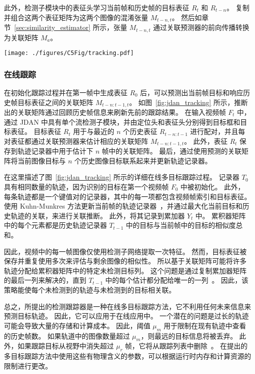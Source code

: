 此外，检测子模块中的表征头学习当前帧和历史帧的目标表征 $R_t$ 和 $R_{t-n}$。
复制并组合这两个表征矩阵为这两个图像的混淆张量 $M_{t-n,t}$。
然后如章节~\ref{sec:similarity_estimator} 所示，张量 $M_{t-n, t}$ 通过关联预测器的前向传播转换为关联矩阵 $M_a$。

\begin{figure*}[ht]
	\centering
	\texttt{[image: ./figures/C5Fig/tracking.pdf]}
	\vspace{0.2em}
	\caption{JDAN 执行在线多目标跟踪的过程}
	\label{fig:jdan_tracking}
\end{figure*}

\subsubsection{在线跟踪}
在初始化跟踪过程并在第一帧中生成表征 $R_0$ 后，可以预测出当前帧目标和响应历史帧目标表征之间的关联矩阵 $M_{t-n:t-1,t}$。
如图~\ref{fig:jdan_tracking} 所示，推断出的关联矩阵通过回顾历史帧信息来刷新先前的跟踪结果。
在输入视频帧 $F_t$ 中，通过 JDAN 中具有单个流检测子模块，并由定位头和表征头分别得到目标框和目标表征。
目标表征 $R_t$ 用于与最近的 $n$ 个历史表征 $R_{t-n:t-1}$ 进行配对，并且每对表征都通过关联预测器来估计相应的关联矩阵 $M_{t-n:t-1,t}$。
此外，表征 $R_t$ 保存到轨迹记录器中用于估计下 $n$ 帧中的关联矩阵。
最后，通过使用预测的关联矩阵将当前图像目标与 $n$ 个历史图像目标联系起来并更新轨迹记录器。

在这里描述了图~\ref{fig:jdan_tracking} 所示的详细在线多目标跟踪过程。
记录器 $T_0$ 具有相同数量的轨迹，因为识别的目标在第一个视频帧 $F_0$ 中被初始化。
此外，每条轨迹都是一个键值对的记录器，其中的每一项都包含视频帧索引和目标表征。
使用 Kuhn-Munkres 方法更新当前帧的轨迹记录器~\cite{Munkres1957}，并通过最大化当前目标和历史轨迹的关联，来进行关联推断。
此外，将其记录到累加器 $Y_{t}$ 中。
累积器矩阵中的每个元素都是历史轨迹记录器 $T_{t-1}$ 中的目标与当前帧中的目标的相似度总和。

因此，视频中的每一帧图像仅使用检测子网络提取一次特征。
然而，目标表征被保存并重复使用多次来评估与剩余图像的相似性。
所以基于关联矩阵可能将许多轨迹分配给累积器矩阵中的特定未检测目标列。
这个问题是通过复制累加器矩阵的最后一列来解决的，直到 $T_{t-1}$ 中的每个估计都分配给唯一的一列~\cite{dan}。
因此，该策略能使每个未检测到的轨迹与未检测到的目标相关联。

总之，所提出的检测跟踪器是一种在线多目标跟踪方法，它不利用任何未来信息来预测目标轨迹。
因此，它可以应用于在线应用中。
一个潜在的问题是过长的轨迹可能会导致大量的存储和计算成本。
因此，阈值 $\mu_m$ 用于限制在现有轨迹中查看的历史帧数。
如果轨道中的图像数量超过 $\mu_m$，则最远的目标信息将被丢弃。
此外，如果跟踪目标从视野中消失超过 $\mu_r$ 帧，它将从跟踪列表中删除~\cite{train_mot}。
在提出的多目标跟踪方法中使用这些有物理含义的参数，可以根据运行时内存和计算资源的限制进行更改。

